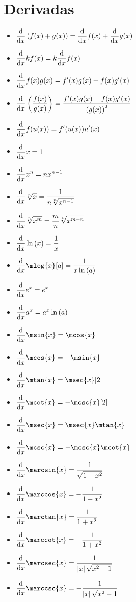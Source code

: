 \section{Derivadas}
\begin{itemize}
	\item $\ds\odv[switch-*,fun=true]{f(x) + g(x)}{x} =\odv[switch-*]{f(x)}{x} +\odv[switch-*]{g(x)}{x}$
	\item $\ds\odv[switch-*]{kf(x)}{x} =k\odv[switch-*]{f(x)}{x}$
	\item $\ds\odv[switch-*]{f(x)g(x)}{x} =f'(x)g(x) + f(x)g'(x)$
	\item $\ds\odv[switch-*,fun=true]{\dfrac{f(x)}{g(x)}}{x} =\dfrac{f'(x)g(x) - f(x)g'(x)}{\pa{g(x)}^{2}}$
	\item $\ds\odv[switch-*]{f(u(x))}{x} =f'(u(x))u'(x)$
	\item $\ds\odv[switch-*]{x}{x} = 1$
	\item $\ds\odv[switch-*]{x^{n}}{x} = nx^{n - 1}$
	\item $\ds\odv[switch-*]{\sqrt[n]{x}}{x} =\dfrac{1}{n\sqrt[n]{x^{n - 1}}}$
	\item $\ds\odv[switch-*]{\sqrt[n]{x^{m}}}{x} =\dfrac{m}{n}\sqrt[n]{x^{m - n}}$
	\item $\ds\odv[switch-*]{\mln{x}}{x} = \dfrac{1}{x}$
	\item $\ds\odv[switch-*]{\mlog{x}[a]}{x} =\dfrac{1}{x\mln{a}}$
	\item $\ds\odv[switch-*]{e^{x}}{x} = e^{x}$
	\item $\ds\odv[switch-*]{a^{x}}{x} = a^{x}\mln{a}$
	\item $\ds\odv[switch-*]{\msin{x}}{x} =\mcos{x}$
	\item $\ds\odv[switch-*]{\mcos{x}}{x} = -\msin{x}$
	\item $\ds\odv[switch-*]{\mtan{x}}{x} =\msec{x}[2]$
	\item $\ds\odv[switch-*]{\mcot{x}}{x} = -\mcsc{x}[2]$
	\item $\ds\odv[switch-*]{\msec{x}}{x} =\msec{x}\mtan{x}$
	\item $\ds\odv[switch-*]{\mcsc{x}}{x} = -\mcsc{x}\mcot{x}$
	\item $\ds\odv[switch-*]{\marcsin{x}}{x} =\dfrac{1}{\sqrt{1 - x^{2}}}$
	\item $\ds\odv[switch-*]{\marccos{x}}{x} = -\dfrac{1}{1 - x^{2}}$
	\item $\ds\odv[switch-*]{\marctan{x}}{x} =\dfrac{1}{1 + x^{2}}$
	\item $\ds\odv[switch-*]{\marccot{x}}{x} = -\dfrac{1}{1 + x^{2}}$
	\item $\ds\odv[switch-*]{\marcsec{x}}{x} =\dfrac{1}{\abs{x}\sqrt{x^{2} - 1}}$
	\item $\ds\odv[switch-*]{\marccsc{x}}{x} = -\dfrac{1}{\abs{x}\sqrt{x^{2} - 1}}$
\end{itemize}